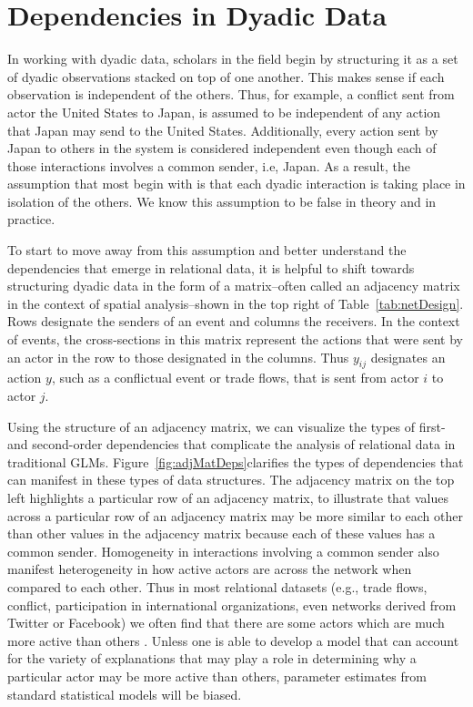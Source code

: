 \section{\textbf{Dependencies in Dyadic Data}}

In working with dyadic data, scholars in the field begin by structuring it as a set of dyadic observations stacked on top of one another. This makes sense if each observation is independent of the others. Thus, for example, a conflict sent from actor the United States to Japan, is assumed to be independent of any action that Japan may send to the United States. Additionally, every action sent by Japan to others in the system is considered independent even though each of those interactions involves a common sender, i.e, Japan. As a result, the assumption that most begin with is that each dyadic interaction is taking place in isolation of the others.  We know this assumption to be false in theory and in practice.


\FloatBarrier

To start to move away from this assumption and better understand the dependencies that emerge in relational data, it is helpful to shift towards structuring dyadic data in the form of a matrix--often called an adjacency matrix in the context of spatial analysis--shown in the top right of Table~\ref{tab:netDesign}. Rows designate the senders of an event and columns the receivers. In the context of events, the cross-sections in this matrix represent the actions that were sent by an actor in the row to those designated in the columns. Thus $y_{ij}$ designates an action $y$, such as a conflictual event or trade flows, that is sent from actor $i$ to actor $j$. 

Using the structure of an adjacency matrix, we can visualize the types of first- and second-order dependencies that complicate the analysis of relational data in traditional GLMs. Figure~\ref{fig:adjMatDeps}clarifies the types of dependencies that can manifest in these types of data structures. The adjacency matrix on the top left highlights a particular row of an adjacency matrix, to illustrate that values across a particular row of an adjacency matrix may be more similar to each other than other values in the adjacency matrix because each of these values has a common sender. Homogeneity in interactions involving a common sender also manifest heterogeneity in how active actors are across the network when compared to each other. Thus in most relational datasets (e.g., trade flows, conflict, participation in international organizations, even networks derived from Twitter or Facebook) we often find that there are some actors which are much more active than others \citep{barabasi:reka:1999}. Unless one is able to develop a model that can account for the variety of explanations that may play a role in determining why a particular actor may be more active than others, parameter estimates from standard statistical models will be biased.

